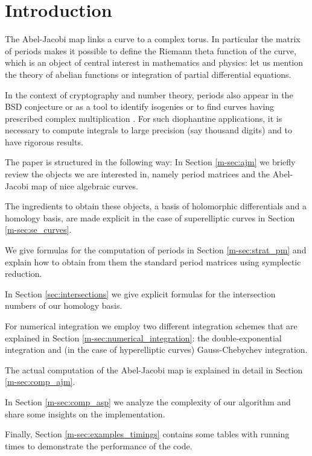 \documentclass[main.tex]{subfiles}
\begin{document}
  \section{Introduction}

  The Abel-Jacobi map links a curve to a complex torus.
  In particular the matrix of periods makes it possible to define the Riemann
  theta function of the curve, which is an object of central interest in
  mathematics and physics: let us
  mention the theory of abelian functions or integration of partial differential
  equations.

  In the context of cryptography and number theory, periods also appear
  in the BSD conjecture or as a tool to identify isogenies or to find
  curves having prescribed complex multiplication \cite{vanWamelen06}.
  For such diophantine applications, it is necessary to compute
  integrals to large precision (say thousand digits) and to have
  rigorous results.

  
  
  The paper is structured in the following way: 
  In Section \ref{m-sec:ajm} we briefly review the objects we are interested in, namely period matrices and the Abel-Jacobi map of nice algebraic curves.
  
  The ingredients to obtain these objects, a basis of holomorphic differentials and a homology basis, are made explicit in the case of superelliptic curves in Section \ref{m-sec:se_curves}.
  
  We give formulas for the computation of periods in Section \ref{m-sec:strat_pm} and explain how to obtain from them the standard period matrices using symplectic reduction.
  
  In Section \ref{sec:intersections} we give explicit formulas for the intersection numbers of our homology basis.
  
  For numerical integration we employ two different integration schemes that are explained in Section \ref{m-sec:numerical_integration}: the double-exponential integration and
  (in the case of hyperelliptic curves) Gauss-Chebychev integration.
  
  The actual computation of the Abel-Jacobi map is explained in detail in Section \ref{m-sec:comp_ajm}.
  
  In Section \ref{m-sec:comp_asp} we analyze the complexity of our algorithm and share some insights on the implementation.
  
  Finally, Section \ref{m-sec:examples_timings} contains some tables with running times to demonstrate the performance of the code.
  
\end{document}
